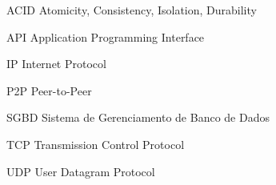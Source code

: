 
\begin{siglas}
  \item[ACID] Atomicity, Consistency, Isolation, Durability
  \item[API] Application Programming Interface
  \item[IP] Internet Protocol
  \item[P2P] Peer-to-Peer
  \item[SGBD] Sistema de Gerenciamento de Banco de Dados
  \item[TCP] Transmission Control Protocol
  \item[UDP] User Datagram Protocol
\end{siglas}

